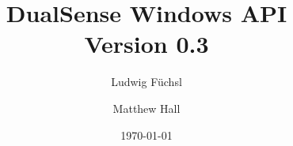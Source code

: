 \documentclass[12pt, a4paper, oneside]{article}
\begin{document}
\author{ Ludwig F{\"u}chsl \and Matthew Hall }
\title{DualSense Windows API \protect\\ Version 0.3}
\date{\today}
\maketitle

\tableofcontents








\end{document}
